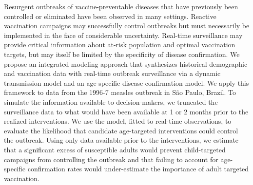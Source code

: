 Resurgent outbreaks of vaccine-preventable diseases that have previously been controlled or eliminated have been observed in many settings. Reactive vaccination campaigns may successfully control outbreaks but must necessarily be implemented in the face of considerable uncertainty.  Real-time surveillance may provide critical information about at-risk population and optimal vaccination targets, but may itself be limited by the specificity of disease confirmation. We propose an integrated modeling approach that synthesizes historical demographic and vaccination data with real-time outbreak surveillance via a dynamic transmission model and an age-specific disease confirmation model. We apply this framework to data from the 1996-7 measles outbreak in São Paulo, Brazil. To simulate the information available to decision-makers, we truncated the surveillance data to what would have been available at 1 or 2 months prior to the realized interventions. We use the model, fitted to real-time observations, to evaluate the likelihood that candidate age-targeted interventions could control the outbreak. Using only data available prior to the interventions, we estimate that a significant excess of susceptible adults would prevent child-targeted campaigns from controlling the outbreak and that failing to account for age-specific confirmation rates would under-estimate the importance of adult targeted vaccination.